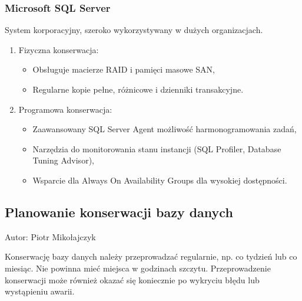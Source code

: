 \documentclass[letterpaper,10pt,polish]{sphinxmanual}
\begin{document}
\subsubsection{Microsoft SQL Server}
\label{\detokenize{rozdzial2/Kontrola_i_konserwacja/kontrola_i_konserwacja:microsoft-sql-server}}
\sphinxAtStartPar
System korporacyjny, szeroko wykorzystywany w dużych organizacjach.
\begin{enumerate}
%
\item {} 
\sphinxAtStartPar
Fizyczna konserwacja:
\begin{itemize}
\item {} 
\sphinxAtStartPar
Obsługuje macierze RAID i pamięci masowe SAN,

\item {} 
\sphinxAtStartPar
Regularne kopie pełne, różnicowe i dzienniki transakcyjne.

\end{itemize}

\item {} 
\sphinxAtStartPar
Programowa konserwacja:
\begin{itemize}
\item {} 
\sphinxAtStartPar
Zaawansowany SQL Server Agent \textendash{} możliwość harmonogramowania zadań,

\item {} 
\sphinxAtStartPar
Narzędzia do monitorowania stanu instancji (SQL Profiler, Database Tuning Advisor),

\item {} 
\sphinxAtStartPar
Wsparcie dla Always On Availability Groups dla wysokiej dostępności.

\end{itemize}

\end{enumerate}


\subsection{Planowanie konserwacji bazy danych}
\label{\detokenize{rozdzial2/Kontrola_i_konserwacja/kontrola_i_konserwacja:planowanie-konserwacji-bazy-danych}}
\sphinxAtStartPar
Autor: Piotr Mikołajczyk

\sphinxAtStartPar
Konserwację bazy danych należy przeprowadzać regularnie, np. co tydzień lub co miesiąc. Nie powinna mieć miejsca w godzinach szczytu. Przeprowadzenie konserwacji może również okazać się koniecznie po wykryciu błędu lub wystąpieniu awarii.
\end{document}
